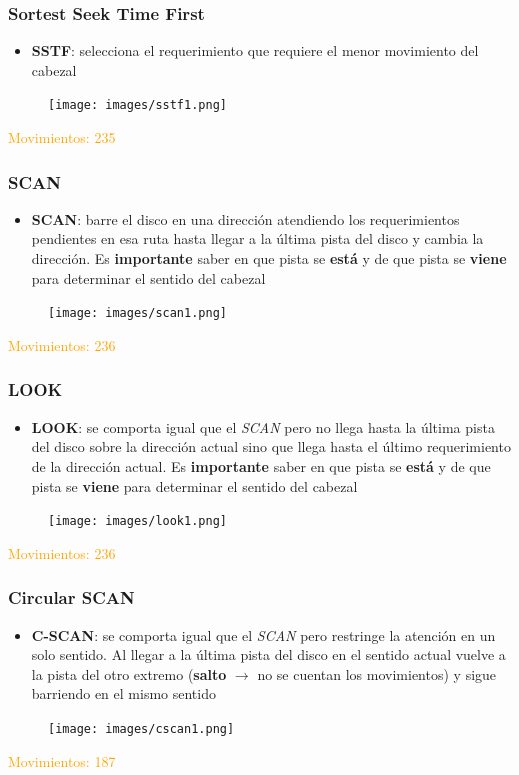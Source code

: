 \begin{frame}
  \frametitle{\textbf{Sortest Seek Time First}}
  \begin{itemize}
    \item \textbf{SSTF}: selecciona el requerimiento que requiere el menor movimiento del cabezal
  \end{itemize}
  \begin{figure}
    \texttt{[image: images/sstf1.png]}
  \end{figure}
  \hspace{35pt} \textcolor{orange}{Movimientos: 235}
\end{frame}

\begin{frame}
  \frametitle{\textbf{SCAN}}
  \begin{itemize}
    \item \textbf{SCAN}: barre el disco en una dirección atendiendo los requerimientos pendientes en esa ruta hasta llegar a la última pista del disco y cambia la dirección. Es \textbf{importante} saber en que pista se \textbf{está} y de que pista se \textbf{viene} para determinar el sentido del cabezal
  \end{itemize}
  \begin{figure}
    \texttt{[image: images/scan1.png]}
  \end{figure}
  \hspace{35pt} \textcolor{orange}{Movimientos: 236}
\end{frame}

\begin{frame}
  \frametitle{\textbf{LOOK}}
  \begin{itemize}
    \item \textbf{LOOK}: se comporta igual que el \textit{SCAN} pero no llega hasta la última pista del disco sobre la dirección actual sino que llega hasta el último requerimiento de la dirección actual. Es \textbf{importante} saber en que pista se \textbf{está} y de que pista se \textbf{viene} para determinar el sentido del cabezal
  \end{itemize}
  \begin{figure}
    \texttt{[image: images/look1.png]}
  \end{figure}
  \hspace{35pt} \textcolor{orange}{Movimientos: 236}
\end{frame}

\begin{frame}
  \frametitle{\textbf{Circular SCAN}}
  \begin{itemize}
    \item \textbf{C-SCAN}: se comporta igual que el \textit{SCAN} pero restringe la atención en un solo sentido. Al llegar a la última pista del disco en el sentido actual vuelve a la pista del otro extremo (\textbf{salto} $\rightarrow$ no se cuentan los movimientos) y sigue barriendo en el mismo sentido
  \end{itemize}
  \begin{figure}
    \texttt{[image: images/cscan1.png]}
  \end{figure}
  \hspace{35pt} \textcolor{orange}{Movimientos: 187}
\end{frame}


